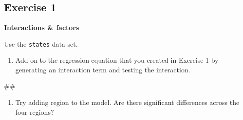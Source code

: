 \documentclass[]{book}
\newenvironment{Shaded}{\begin{snugshade}}{\end{snugshade}}
\newcommand{\KeywordTok}[1]{\textcolor[rgb]{0.13,0.29,0.53}{\textbf{#1}}}
\newcommand{\DataTypeTok}[1]{\textcolor[rgb]{0.13,0.29,0.53}{#1}}
\newcommand{\DecValTok}[1]{\textcolor[rgb]{0.00,0.00,0.81}{#1}}
\newcommand{\StringTok}[1]{\textcolor[rgb]{0.31,0.60,0.02}{#1}}
\newcommand{\CommentTok}[1]{\textcolor[rgb]{0.56,0.35,0.01}{\textit{#1}}}
\newcommand{\OperatorTok}[1]{\textcolor[rgb]{0.81,0.36,0.00}{\textbf{#1}}}
\newcommand{\NormalTok}[1]{#1}
\providecommand{\tightlist}{%
  \setlength{\itemsep}{0pt}\setlength{\parskip}{0pt}}
\begin{document}
\begin{Shaded}
\end{Shaded}

\subsection{Exercise 1}\label{exercise-1-1}

\textbf{Interactions \& factors}

Use the \texttt{states} data set.

\begin{enumerate}
\def\labelenumi{\arabic{enumi}.}
\tightlist
\item
  Add on to the regression equation that you created in Exercise 1 by
  generating an interaction term and testing the interaction.
\end{enumerate}

\begin{Shaded}
\begin{Highlighting}[]
\NormalTok{## }
\end{Highlighting}
\end{Shaded}

\begin{enumerate}
\def\labelenumi{\arabic{enumi}.}
\setcounter{enumi}{1}
\tightlist
\item
  Try adding region to the model. Are there significant differences
  across the four regions?
\end{enumerate}
\end{document}
